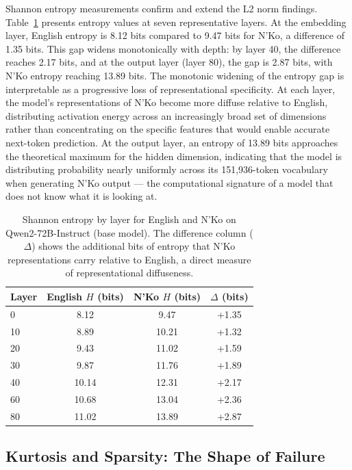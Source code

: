 \documentclass[11pt]{article}
\newcommand{\nko}{N'Ko}
\begin{document}
Shannon entropy measurements confirm and extend the L2 norm findings. Table~\ref{tab:entropy} presents entropy values at seven representative layers. At the embedding layer, English entropy is 8.12 bits compared to 9.47 bits for \nko{}, a difference of 1.35 bits. This gap widens monotonically with depth: by layer 40, the difference reaches 2.17 bits, and at the output layer (layer 80), the gap is 2.87 bits, with \nko{} entropy reaching 13.89 bits. The monotonic widening of the entropy gap is interpretable as a progressive loss of representational specificity. At each layer, the model's representations of \nko{} become more diffuse relative to English, distributing activation energy across an increasingly broad set of dimensions rather than concentrating on the specific features that would enable accurate next-token prediction. At the output layer, an entropy of 13.89 bits approaches the theoretical maximum for the hidden dimension, indicating that the model is distributing probability nearly uniformly across its 151,936-token vocabulary when generating \nko{} output --- the computational signature of a model that does not know what it is looking at.

\begin{table}[ht]
\centering
\caption{Shannon entropy by layer for English and \nko{} on Qwen2-72B-Instruct (base model). The difference column ($\Delta$) shows the additional bits of entropy that \nko{} representations carry relative to English, a direct measure of representational diffuseness.}
\label{tab:entropy}
\begin{tabular}{@{}lccc@{}}
\toprule
Layer & English $H$ (bits) & \nko{} $H$ (bits) & $\Delta$ (bits) \\
\midrule
0 & 8.12 & 9.47 & +1.35 \\
10 & 8.89 & 10.21 & +1.32 \\
20 & 9.43 & 11.02 & +1.59 \\
30 & 9.87 & 11.76 & +1.89 \\
40 & 10.14 & 12.31 & +2.17 \\
60 & 10.68 & 13.04 & +2.36 \\
80 & 11.02 & 13.89 & +2.87 \\
\bottomrule
\end{tabular}
\end{table}

\subsection{Kurtosis and Sparsity: The Shape of Failure}
\label{sec:kurtosis_sparsity}
\end{document}
